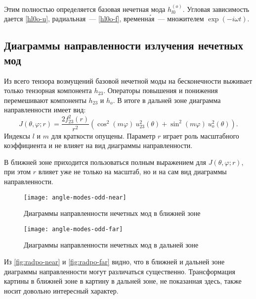 \documentclass[\docroot/reports/draft/report.tex]{subfiles}
\begin{document}
    Этим полностью определяется базовая нечетная мода $h^{(o)}_{l0}$. Угловая зависимость дается \autoref{hl0o-u}, радиальная~--- \autoref{hl0o-f}, временн\'{а}я~--- множителем $\exp(-i \omega t)$.

\subsection{Диаграммы направленности излучения нечетных мод}

    Из всего тензора возмущений базовой нечетной моды на бесконечности выживает только тензорная компонента $h_{23}$. Операторы повышения и понижения перемешивают компоненты $h_{23}$ и $h_o$. В итоге в дальней зоне диаграмма направленности имеет вид:
    \begin{equation}\label{eq:radpo-far}
        J(\theta,\varphi;r) = \frac{2f^2_{23}(r)}{r^2} (\cos^2(m\varphi)\ u^2_{23}(\theta) + \sin^2(m\varphi)\ u^2_o(\theta)) .
    \end{equation}
    Индексы $l$ и $m$ для краткости опущены. Параметр $r$ играет роль масштабного коэффициента и не влияет на вид диаграммы направленности.

    В ближней зоне приходится пользоваться полным выражением для $J(\theta,\varphi;r)$, при этом $r$ влияет уже не только на масштаб, но и на сам вид диаграммы направленности.

    \begin{figure}[!htb]%
        \centering\texttt{[image: angle-modes-odd-near]}%
        \caption[]{Диаграммы направленности нечетных мод в ближней зоне}%
        \label{fig:radpo-near}%
    \end{figure}

    \begin{figure}[!htb]%
        \centering\texttt{[image: angle-modes-odd-far]}%
        \caption[]{Диаграммы направленности нечетных мод в дальней зоне}%
        \label{fig:radpo-far}%
    \end{figure}

    Из \autoref{fig:radpo-near} и \autoref{fig:radpo-far} видно, что в ближней и дальней зоне диаграммы направленности могут различаться существенно. Трансформация картины в ближней зоне в картину в дальней зоне, не показанная здесь, также носит довольно интересный характер.
\end{document}
